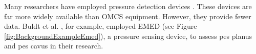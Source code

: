 Many researchers \cite{Buldt2018FootPI, articleKeukenkampDiabeticMedicine, BOSCH2010564} have employed pressure detection devices \cite{novel_2021, medilogic_2021}. These devices are far more widely available than OMCS equipment. However, they provide fewer data. Buldt et al. \cite{Buldt2018FootPI}, for example, employed EMED (see Figure \ref{fig:BackgroundExampleEmed}), a pressure sensing device, to assess pes planus and pes cavus in their research.